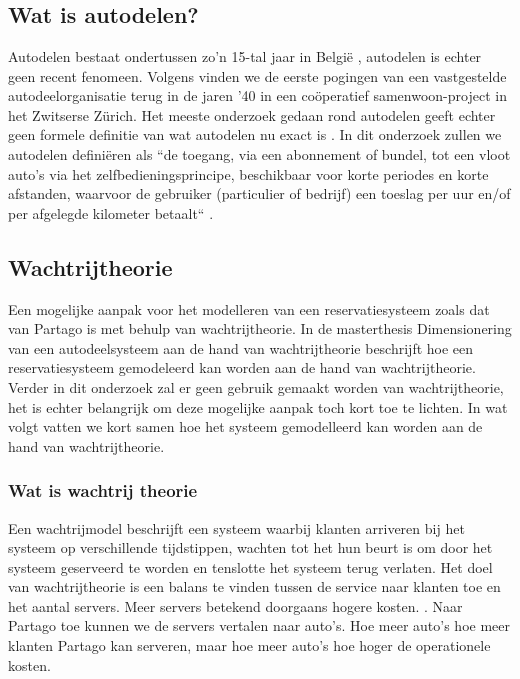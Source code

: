 \chapter{}
\label{ch:stand-van-zaken}



\section{Wat is autodelen?}
Autodelen bestaat ondertussen zo'n 15-tal jaar in België \autocite{ing}, autodelen is echter geen recent fenomeen. Volgens \textcite{millardball} vinden we de eerste pogingen van een vastgestelde autodeelorganisatie terug in de jaren '40 in een coöperatief samenwoon-project in het Zwitserse Zürich. Het meeste onderzoek gedaan rond autodelen geeft echter geen formele definitie van wat autodelen nu exact is \autocite{millardball}. In dit onderzoek zullen we autodelen definiëren als ``de toegang, via een abonnement of bundel, tot een vloot auto's via het zelfbedieningsprincipe, beschikbaar voor korte periodes en korte afstanden, waarvoor de gebruiker (particulier of bedrijf) een toeslag per uur en/of per afgelegde kilometer betaalt`` \autocite{ing}.

\section{Wachtrijtheorie}
Een mogelijke aanpak voor het modelleren van een reservatiesysteem zoals dat van Partago is met behulp van wachtrijtheorie. In de masterthesis Dimensionering van een autodeelsysteem aan de hand van wachtrijtheorie beschrijft \textcite{van-buggenhout} hoe een reservatiesysteem gemodeleerd kan worden aan de hand van wachtrijtheorie. Verder in dit onderzoek zal er geen gebruik gemaakt worden van wachtrijtheorie, het is echter belangrijk om deze mogelijke aanpak toch kort toe te lichten. In wat volgt vatten we kort samen hoe het systeem gemodelleerd kan worden aan de hand van wachtrijtheorie.

\subsection{Wat is wachtrij theorie}
Een wachtrijmodel beschrijft een systeem waarbij klanten arriveren bij het systeem op verschillende tijdstippen, wachten tot het hun beurt is om door het systeem geserveerd te worden en tenslotte het systeem terug verlaten. Het doel van wachtrijtheorie is een balans te vinden tussen de service naar klanten toe en het aantal servers. Meer servers betekend doorgaans hogere kosten. \textcite{van-buggenhout}. Naar Partago toe kunnen we de servers vertalen naar auto's. Hoe meer auto's hoe meer klanten Partago kan serveren, maar hoe meer auto's hoe hoger de operationele kosten. 

